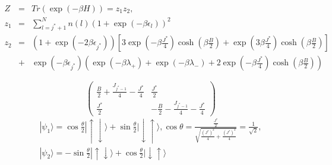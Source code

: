 \documentclass[aps,prx,preprint,groupedaddress]{revtex4-2}
\begin{document}
\begin{eqnarray}
Z&=&Tr(\exp(-\beta H))=z_{1}z_{2},\nonumber\\
z_{1}&=&\sum_{l=j^{*}+1}^{N}n(l)(1+\exp(-\beta\epsilon_{l}))^{2}\nonumber\\
z_{2}&=&(1+\exp(-2\beta\epsilon_{j^{*}}))\left[3\exp(-\beta \frac{J^{*}}{4})\cosh(\beta\frac{B}{2})+\exp(3\beta \frac{J^{*}}{4})\cosh(\beta\frac{B}{2})\right]\nonumber\\
&+&\exp(-\beta\epsilon_{j^{*}})(\exp(-\beta\lambda_{+})+\exp(-\beta\lambda_{-})+2\exp(-\beta \frac{J^{*}}{4})\cosh(\beta\frac{B}{2}))
\end{eqnarray}



%
\begin{equation}
\begin{pmatrix}
\frac{B}{2}+\frac{J_{j^{*}-1}}{4}-\frac{J^{*}}{4} & \frac{J^{*}}{2}\\
\frac{J^{*}}{2} & -\frac{B}{2}-\frac{J_{j^{*}-1}}{4}-\frac{J^{*}}{4}
\end{pmatrix}
\end{equation}
\begin{eqnarray}
|\psi_{1}\rangle = \cos\frac{\theta}{2}|\uparrow\downarrow\rangle+\sin\frac{\theta}{2}|\downarrow\uparrow\rangle , \cos\theta  = \frac{\frac{J^{*}}{2}}{\sqrt{\frac{(J^{*})^{2}}{4}+\frac{(J^{*})^{2}}{4}}}=\frac{1}{\sqrt{2}},\nonumber\\
|\psi_{2}\rangle = -\sin\frac{\theta}{2}|\uparrow\downarrow\rangle +\cos\frac{\theta}{2}|\downarrow\uparrow\rangle
\end{eqnarray}
\end{document}
